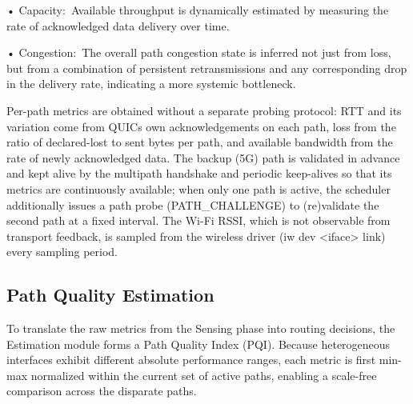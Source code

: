 \documentclass[preprint,11pt]{elsarticle}
\begin{document}
• Capacity:~Available throughput is dynamically estimated by measuring the rate of acknowledged data delivery over time.

• Congestion:~The overall path congestion state is inferred not just from loss, but from a combination of persistent retransmissions and any corresponding drop in the delivery rate, indicating a more systemic bottleneck.

Per-path metrics are obtained without a separate probing protocol: RTT and its variation come from QUIC\textquotesingle s own acknowledgements on each path, loss from the ratio of declared-lost to sent bytes per path, and available bandwidth from the rate of newly acknowledged data. The backup (5G) path is validated in advance and kept alive by the multipath handshake and periodic keep-alives so that its metrics are continuously available; when only one path is active, the scheduler additionally issues a path probe (PATH\_CHALLENGE) to (re)validate the second path at a fixed interval. The Wi-Fi RSSI, which is not observable from transport feedback, is sampled from the wireless driver (iw dev \textless iface\textgreater{} link) every sampling period.
\subsection{Path Quality Estimation}
To translate the raw metrics from the Sensing phase into routing decisions, the Estimation module forms a Path Quality Index (PQI). Because heterogeneous interfaces exhibit different absolute performance ranges, each metric is first min-max normalized within the current set of active paths, enabling a scale-free comparison across the disparate paths.
\end{document}
